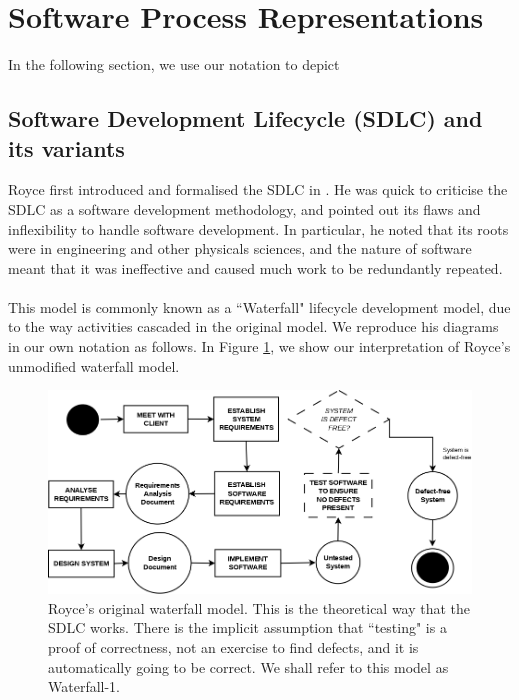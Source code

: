 \section{Software Process Representations} \label{diagrams}

In the following section, we use our notation to depict 

\subsection{Software Development Lifecycle (SDLC) and its variants}
Royce first introduced and formalised the SDLC in
\cite{Royce:1987:MDL:41765.41801}.
He was quick to criticise the SDLC as a software development methodology, and pointed out its flaws
and inflexibility to handle software development.
In particular, he noted that its roots were in engineering and other physicals sciences, and the
nature of software meant that it was ineffective and caused much work to be redundantly repeated.\\
\\
This model is commonly known as a ``Waterfall" lifecycle development model, due to the way
activities cascaded in the original model.
We reproduce his diagrams in our own notation as follows.
In Figure \ref{waterfallRoyceOne}, we show our interpretation of Royce's unmodified waterfall model.

\begin{figure}[ht!]
	\centering
	\includegraphics[scale=0.3]{media/WaterfallRoyceOne}
	\caption{Royce's original waterfall model. This is the theoretical way that
    the SDLC works. There is the implicit assumption that ``testing" is a proof
      of correctness, not an exercise to find defects, and it is automatically
      going to be correct. We shall refer to this model as Waterfall-1.}
	\label{waterfallRoyceOne}
\end{figure}

